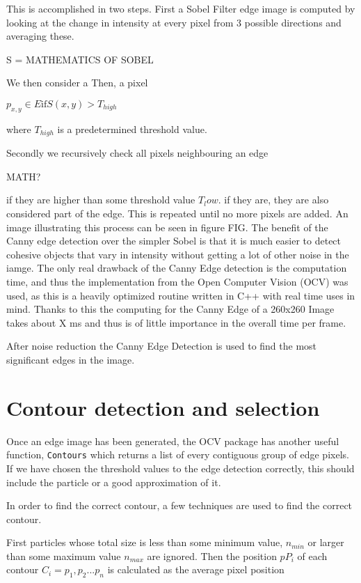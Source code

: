 \documentclass[]{report}
\begin{document}
This is accomplished in two steps. First a Sobel Filter edge image is computed by looking at the change in intensity at every pixel from 3 possible directions and averaging these. 

S = MATHEMATICS OF SOBEL

We then consider a Then, a pixel 

$p_{x,y} \in E \text{if} S(x,y) > T_{high}$

where $T_{high}$ is a predetermined threshold value. 

Secondly we recursively check all pixels neighbouring an edge

MATH?

 if they are higher than some threshold value $T_low$. if they are, they are also considered part of the edge. This is repeated until no more pixels are added. An image illustrating this process can be seen in figure FIG. The benefit of the Canny edge detection over the simpler Sobel is that it is much easier to detect cohesive objects that vary in intensity without getting a lot of other noise in the iamge. The only real drawback of the Canny Edge detection is the computation time, and thus the implementation from the Open Computer Vision (OCV) was used, as this is a heavily optimized routine written in C++ with real time uses in mind. Thanks to this the computing for the Canny Edge of a 260x260 Image takes about X ms and thus is of little importance in the overall time per frame.

After noise reduction the Canny Edge Detection is used to find the most significant edges in the image. 

\section{Contour detection and selection}

Once an edge image has been generated, the OCV package has another useful function, \texttt{Contours} which returns a list of every contiguous group of edge pixels. If we have chosen the threshold values to the edge detection correctly, this should include the particle or a good approximation of it. 

In order to find the correct contour, a few techniques are used to find the correct contour.

First particles whose total size is less than some minimum value, $ n_{min}$ or larger than some maximum value $n_{max}$ are ignored. Then the position $pP_i$ of each contour $C_i={p_1,p_2...p_n}$ is calculated as the average pixel position
\end{document}
